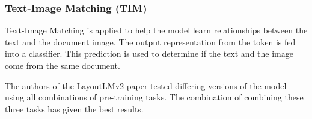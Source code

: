 \subsubsection{Text-Image Matching (TIM)}
Text-Image Matching is applied to help the model learn relationships between the text and
the document image. The output representation from the \code{[CLS]} token is fed into a classifier. This
prediction is used to determine if the text and the image come from the same document.

\bigbreak
The authors of the LayoutLMv2 paper tested differing versions of the model using all combinations of pre-training tasks. The
combination of combining these three tasks has given the best results.
